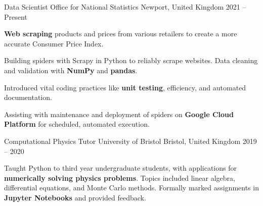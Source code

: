 
\begin{cventries}

    \cventry
        {Data Scientist} %
        {Office for National Statistics} %
        {Newport, United Kingdom} %
        {2021 -- Present} %
        {
            \begin{cvitems} %
                \item{\textbf{Web scraping} products and prices from various retailers to create a more accurate Consumer Price Index.}
                \item{Building spiders with Scrapy in Python to reliably scrape websites. Data cleaning and validation with \textbf{NumPy} and \textbf{pandas}.}
                \item{Introduced vital coding practices like \textbf{unit testing}, efficiency, and automated documentation.}
                \item{Assisting with maintenance and deployment of spiders on \textbf{Google Cloud Platform} for scheduled, automated execution.}
            \end{cvitems}
        }

    \cventry
        {Computational Physics Tutor} %
        {University of Bristol} %
        {Bristol, United Kingdom} %
        {2019 -- 2020} %
        {
            \begin{cvitems} %
                \item{Taught Python to third year undergraduate students, with applications for \textbf{numerically solving physics problems}. Topics included linear algebra, differential equations, and Monte Carlo methods. Formally marked assignments in \textbf{Jupyter Notebooks} and provided feedback.}
            \end{cvitems}
        }


\end{cventries}
